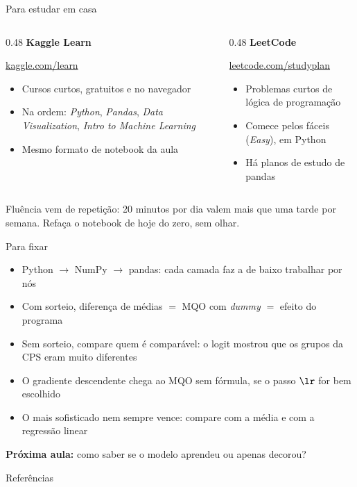 \documentclass[aspectratio=169,11pt]{beamer}
\begin{document}
\begin{frame}{Para estudar em casa}
  \begin{columns}[T]
    \begin{column}{0.48\textwidth}
      \textbf{Kaggle Learn}\par
      \small\href{https://www.kaggle.com/learn}{kaggle.com/learn}
      \begin{itemize}\small
        \item Cursos curtos, gratuitos e no navegador
        \item Na ordem: \emph{Python}, \emph{Pandas}, \emph{Data Visualization},
              \emph{Intro to Machine Learning}
        \item Mesmo formato de notebook da aula
      \end{itemize}
    \end{column}
    \begin{column}{0.48\textwidth}
      \textbf{LeetCode}\par
      \small\href{https://leetcode.com/studyplan/}{leetcode.com/studyplan}
      \begin{itemize}\small
        \item Problemas curtos de lógica de programação
        \item Comece pelos fáceis (\emph{Easy}), em Python
        \item Há planos de estudo de pandas
      \end{itemize}
    \end{column}
  \end{columns}
  \bigskip
  \begin{intuicao}[title={A dica mais importante}]
    \small Fluência vem de \alert{repetição}: 20 minutos por dia valem mais que
    uma tarde por semana. Refaça o notebook de hoje do zero, sem olhar.
  \end{intuicao}
\end{frame}

\begin{frame}{Para fixar}
  \begin{itemize}
    \item Python $\to$ NumPy $\to$ pandas: cada camada faz a de baixo trabalhar
          por nós
    \item Com sorteio, diferença de médias $=$ MQO com \emph{dummy} $=$ efeito do programa
    \item Sem sorteio, compare quem é comparável: o logit mostrou que os
          grupos da CPS eram muito diferentes
    \item O gradiente descendente chega ao MQO sem fórmula, se o passo
          $\lr$ for bem escolhido
    \item O mais sofisticado nem sempre vence: compare com a média e com a
          regressão linear
  \end{itemize}
  \medskip
  \textbf{Próxima aula:} como saber se o modelo aprendeu ou apenas decorou?
\end{frame}

\begin{frame}{Referências}
  \printbibliography[heading=none]
\end{frame}
\end{document}
